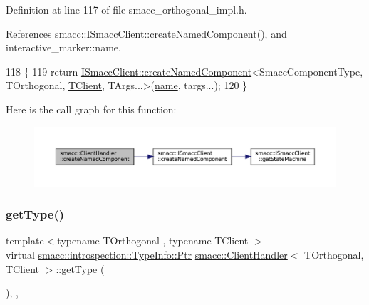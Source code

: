 Definition at line 117 of file smacc\+\_\+orthogonal\+\_\+impl.\+h.



References smacc\+::\+I\+Smacc\+Client\+::create\+Named\+Component(), and interactive\+\_\+marker\+::name.


\begin{DoxyCode}
118     \{
119         \textcolor{keywordflow}{return} \hyperlink{classsmacc_1_1ISmaccClient_affcc2f95bc993b5f07ef0d6ab6eec8f1}{ISmaccClient::createNamedComponent}<SmaccComponentType, 
      TOrthogonal, \hyperlink{classTClient}{TClient}, TArgs...>(\hyperlink{namespaceinteractive__marker_a447655961b3d3ca3c5a2a9d3d769436d}{name}, targs...);
120     \}
\end{DoxyCode}
Here is the call graph for this function\+:
\nopagebreak
\begin{figure}[H]
\begin{center}
\leavevmode
\includegraphics[width=350pt]{classsmacc_1_1ClientHandler_a33f440a8e06038df0dd291d2ea278f39_cgraph}
\end{center}
\end{figure}
\mbox{\label{classsmacc_1_1ClientHandler_a018a50262de782c479414cf18daddac9}} 
\subsubsection{\texorpdfstring{get\+Type()}{getType()}}
{\footnotesize\ttfamily template$<$typename T\+Orthogonal , typename T\+Client $>$ \\
virtual \hyperlink{classsmacc_1_1introspection_1_1TypeInfo_aa6ffd9c39811d59f7c771941b7fad860}{smacc\+::introspection\+::\+Type\+Info\+::\+Ptr} \hyperlink{classsmacc_1_1ClientHandler}{smacc\+::\+Client\+Handler}$<$ T\+Orthogonal, \hyperlink{classTClient}{T\+Client} $>$\+::get\+Type (\begin{DoxyParamCaption}{ }\end{DoxyParamCaption})\hspace{0.3cm}{\ttfamily [inline]}, {\ttfamily [override]}, {\ttfamily [virtual]}}




